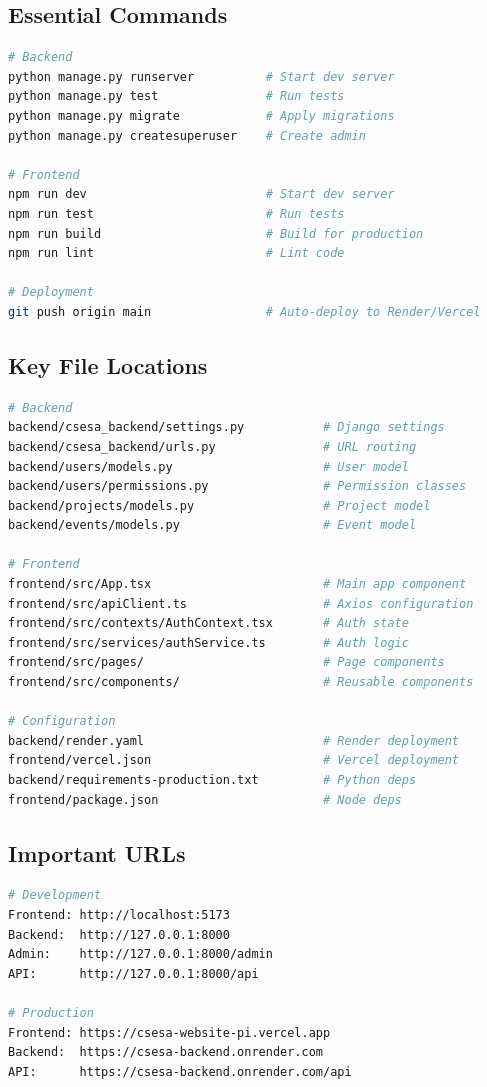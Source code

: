 \documentclass[11pt,a4paper]{article}
\begin{document}
\subsection{Essential Commands}
\begin{lstlisting}[language=bash]
# Backend
python manage.py runserver          # Start dev server
python manage.py test               # Run tests
python manage.py migrate            # Apply migrations
python manage.py createsuperuser    # Create admin

# Frontend
npm run dev                         # Start dev server
npm run test                        # Run tests
npm run build                       # Build for production
npm run lint                        # Lint code

# Deployment
git push origin main                # Auto-deploy to Render/Vercel
\end{lstlisting}


\subsection{Key File Locations}
\begin{lstlisting}[language=bash]
# Backend
backend/csesa_backend/settings.py           # Django settings
backend/csesa_backend/urls.py               # URL routing
backend/users/models.py                     # User model
backend/users/permissions.py                # Permission classes
backend/projects/models.py                  # Project model
backend/events/models.py                    # Event model

# Frontend
frontend/src/App.tsx                        # Main app component
frontend/src/apiClient.ts                   # Axios configuration
frontend/src/contexts/AuthContext.tsx       # Auth state
frontend/src/services/authService.ts        # Auth logic
frontend/src/pages/                         # Page components
frontend/src/components/                    # Reusable components

# Configuration
backend/render.yaml                         # Render deployment
frontend/vercel.json                        # Vercel deployment
backend/requirements-production.txt         # Python deps
frontend/package.json                       # Node deps
\end{lstlisting}

\subsection{Important URLs}
\begin{lstlisting}[language=bash]
# Development
Frontend: http://localhost:5173
Backend:  http://127.0.0.1:8000
Admin:    http://127.0.0.1:8000/admin
API:      http://127.0.0.1:8000/api

# Production
Frontend: https://csesa-website-pi.vercel.app
Backend:  https://csesa-backend.onrender.com
API:      https://csesa-backend.onrender.com/api
\end{lstlisting}
\end{document}
